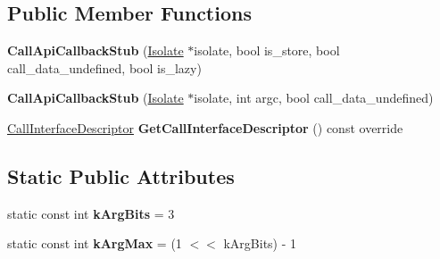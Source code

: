 \subsection*{Public Member Functions}
\begin{DoxyCompactItemize}
\item 
{\bfseries Call\+Api\+Callback\+Stub} (\hyperlink{classv8_1_1internal_1_1_isolate}{Isolate} $\ast$isolate, bool is\+\_\+store, bool call\+\_\+data\+\_\+undefined, bool is\+\_\+lazy)\hypertarget{classv8_1_1internal_1_1_call_api_callback_stub_a1c2b83968c4d6170eea14086974f0944}{}\label{classv8_1_1internal_1_1_call_api_callback_stub_a1c2b83968c4d6170eea14086974f0944}

\item 
{\bfseries Call\+Api\+Callback\+Stub} (\hyperlink{classv8_1_1internal_1_1_isolate}{Isolate} $\ast$isolate, int argc, bool call\+\_\+data\+\_\+undefined)\hypertarget{classv8_1_1internal_1_1_call_api_callback_stub_a90c4ec3e9f7a7ceb0613ed4cd9f2de2b}{}\label{classv8_1_1internal_1_1_call_api_callback_stub_a90c4ec3e9f7a7ceb0613ed4cd9f2de2b}

\item 
\hyperlink{classv8_1_1internal_1_1_call_interface_descriptor}{Call\+Interface\+Descriptor} {\bfseries Get\+Call\+Interface\+Descriptor} () const  override\hypertarget{classv8_1_1internal_1_1_call_api_callback_stub_ab8455ce0508b8f65500adcf53a1dea7f}{}\label{classv8_1_1internal_1_1_call_api_callback_stub_ab8455ce0508b8f65500adcf53a1dea7f}

\end{DoxyCompactItemize}
\subsection*{Static Public Attributes}
\begin{DoxyCompactItemize}
\item 
static const int {\bfseries k\+Arg\+Bits} = 3\hypertarget{classv8_1_1internal_1_1_call_api_callback_stub_a01bed92bdb50d4c1466364c3864b16c3}{}\label{classv8_1_1internal_1_1_call_api_callback_stub_a01bed92bdb50d4c1466364c3864b16c3}

\item 
static const int {\bfseries k\+Arg\+Max} = (1 $<$$<$ k\+Arg\+Bits) -\/ 1\hypertarget{classv8_1_1internal_1_1_call_api_callback_stub_a1b9144f1a90fd2a03f718898bf65af2c}{}\label{classv8_1_1internal_1_1_call_api_callback_stub_a1b9144f1a90fd2a03f718898bf65af2c}

\end{DoxyCompactItemize}
